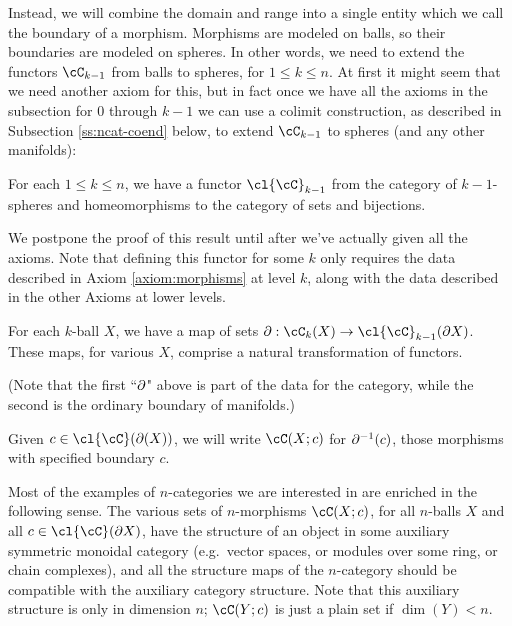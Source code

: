 Instead, we will combine the domain and range into a single entity which we call the 
boundary of a morphism.
Morphisms are modeled on balls, so their boundaries are modeled on spheres.
In other words, we need to extend the functors $\cC_{k-1}$ from balls to spheres, for 
$1\le k \le n$.
At first it might seem that we need another axiom for this, but in fact once we have
all the axioms in the subsection for $0$ through $k-1$ we can use a colimit
construction, as described in Subsection \ref{ss:ncat-coend} below, to extend $\cC_{k-1}$
to spheres (and any other manifolds):

\begin{lem}
\label{lem:spheres}
For each $1 \le k \le n$, we have a functor $\cl{\cC}_{k-1}$ from 
the category of $k{-}1$-spheres and 
homeomorphisms to the category of sets and bijections.
\end{lem}

We postpone the proof \todo{} of this result until after we've actually given all the axioms.
Note that defining this functor for some $k$ only requires the data described in Axiom \ref{axiom:morphisms} at level $k$, 
along with the data described in the other Axioms at lower levels. 


\begin{axiom}[Boundaries]\label{nca-boundary}
For each $k$-ball $X$, we have a map of sets $\bd: \cC_k(X)\to \cl{\cC}_{k-1}(\bd X)$.
These maps, for various $X$, comprise a natural transformation of functors.
\end{axiom}

(Note that the first ``$\partial$" above is part of the data for the category, 
while the second is the ordinary boundary of manifolds.)

Given $c\in\cl{\cC}(\bd(X))$, we will write $\cC(X; c)$ for $\partial^{-1}(c)$, those morphisms with specified boundary $c$.

Most of the examples of $n$-categories we are interested in are enriched in the following sense.
The various sets of $n$-morphisms $\cC(X; c)$, for all $n$-balls $X$ and
all $c\in \cl{\cC}(\bd X)$, have the structure of an object in some auxiliary symmetric monoidal category
(e.g.\ vector spaces, or modules over some ring, or chain complexes),
and all the structure maps of the $n$-category should be compatible with the auxiliary
category structure.
Note that this auxiliary structure is only in dimension $n$;
$\cC(Y; c)$ is just a plain set if $\dim(Y) < n$.

